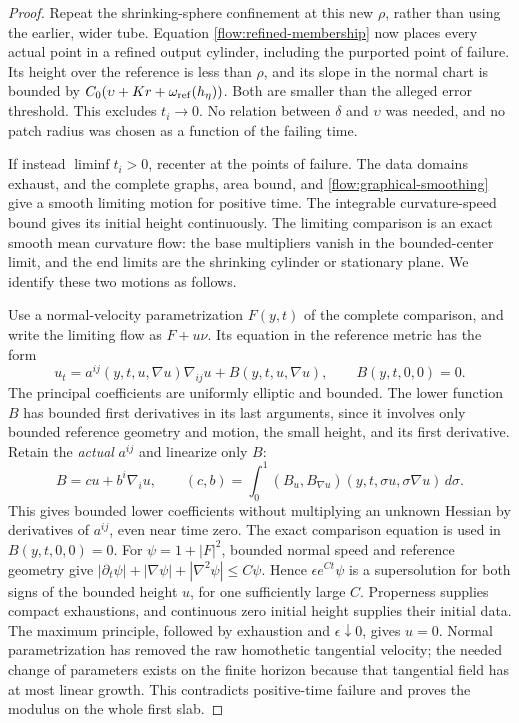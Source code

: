 \begin{proof}
Repeat the shrinking-sphere confinement at this new $\rho$, rather
than using the earlier, wider tube.  Equation
\eqref{flow:refined-membership} now places every actual point in a
refined output cylinder, including the purported point of failure.
Its height over the reference is less than $\rho$, and its slope
in the normal chart is bounded by
$C_0(\upsilon+Kr+\omega_{\rm ref}(h_\eta))$.  Both are smaller
than the alleged error threshold.  This excludes $t_i\to0$.
No relation between $\delta$ and $\upsilon$ was needed, and no
patch radius was chosen as a function of the failing time.

If instead $\liminf t_i>0$, recenter at the points of failure.
The data domains exhaust, and the complete graphs, area bound, and
\eqref{flow:graphical-smoothing} give a smooth limiting motion for
positive time.  The integrable curvature-speed bound gives its
initial height continuously.  The limiting comparison is an exact
smooth mean curvature flow: the base multipliers vanish in the
bounded-center limit, and the end limits are the shrinking cylinder
or stationary plane.  We identify these two motions as follows.

Use a normal-velocity parametrization $F(y,t)$ of the complete
comparison, and write the limiting flow as $F+u\nu$.  Its equation
in the reference metric has the form
\[
 u_t=a^{ij}(y,t,u,\nabla u)\nabla_{ij}u
              +B(y,t,u,\nabla u),\qquad B(y,t,0,0)=0.
\]
The principal coefficients are uniformly elliptic and bounded.
The lower function $B$ has bounded first derivatives in its last
arguments, since it involves only bounded reference geometry and
motion, the small height, and its first derivative.  Retain the
\emph{actual} $a^{ij}$ and linearize only $B$:
\[
 B=cu+b^i\nabla_i u,\qquad
 (c,b)=\int_0^1(B_u,B_{\nabla u})(y,t,\sigma u,\sigma\nabla u)
                                                       \,d\sigma.
\]
This gives bounded lower coefficients without multiplying an unknown
Hessian by derivatives of $a^{ij}$, even near time zero.  The exact
comparison equation is used in $B(y,t,0,0)=0$.
For $\psi=1+|F|^2$, bounded normal speed and reference geometry give
$|\partial_t\psi|+|\nabla\psi|+|\nabla^2\psi|\le C\psi$.
Hence $\epsilon e^{Ct}\psi$ is a supersolution for both signs of
the bounded height $u$, for one sufficiently large $C$.
Properness supplies compact exhaustions, and continuous zero initial
height supplies their initial data.  The maximum principle, followed
by exhaustion and $\epsilon\downarrow0$, gives $u=0$.
Normal parametrization has removed the raw homothetic tangential
velocity; the needed change of parameters exists on the finite
horizon because that tangential field has at most linear growth.
This contradicts positive-time failure and proves the modulus on
the whole first slab.


\end{proof}
